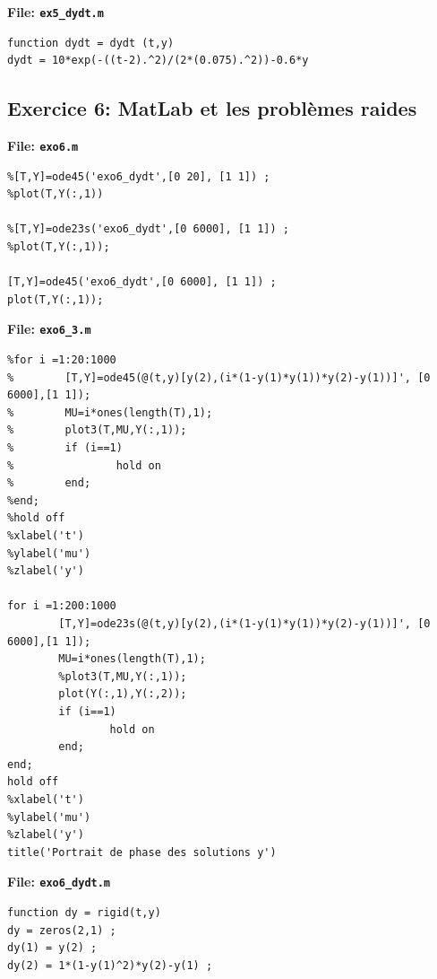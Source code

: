 \documentclass[a4paper,12pt,landscape]{article}
\begin{document}
\textbf{File: \texttt{ex5\_dydt.m}}
\begin{tiny}
\begin{verbatim}
function dydt = dydt (t,y)
dydt = 10*exp(-((t-2).^2)/(2*(0.075).^2))-0.6*y
\end{verbatim}
\end{tiny}
\newpage
\subsection{Exercice 6: MatLab et les problèmes raides}
\textbf{File: \texttt{exo6.m}}
\begin{tiny}
\begin{verbatim}
%[T,Y]=ode45('exo6_dydt',[0 20], [1 1]) ;
%plot(T,Y(:,1))

%[T,Y]=ode23s('exo6_dydt',[0 6000], [1 1]) ;
%plot(T,Y(:,1));

[T,Y]=ode45('exo6_dydt',[0 6000], [1 1]) ;
plot(T,Y(:,1));
\end{verbatim}
\end{tiny}

\textbf{File: \texttt{exo6\_3.m}}
\begin{tiny}
\begin{verbatim}
%for i =1:20:1000
%        [T,Y]=ode45(@(t,y)[y(2),(i*(1-y(1)*y(1))*y(2)-y(1))]', [0 6000],[1 1]);
%        MU=i*ones(length(T),1);
%        plot3(T,MU,Y(:,1));
%        if (i==1)
%                hold on 
%        end;
%end;
%hold off
%xlabel('t')
%ylabel('mu')
%zlabel('y')

for i =1:200:1000
        [T,Y]=ode23s(@(t,y)[y(2),(i*(1-y(1)*y(1))*y(2)-y(1))]', [0 6000],[1 1]);
        MU=i*ones(length(T),1);
        %plot3(T,MU,Y(:,1));
        plot(Y(:,1),Y(:,2));
        if (i==1)
                hold on 
        end;
end;
hold off
%xlabel('t')
%ylabel('mu')
%zlabel('y')
title('Portrait de phase des solutions y')
\end{verbatim}
\end{tiny}

\textbf{File: \texttt{exo6\_dydt.m}}
\begin{tiny}
\begin{verbatim}
function dy = rigid(t,y)
dy = zeros(2,1) ;
dy(1) = y(2) ;
dy(2) = 1*(1-y(1)^2)*y(2)-y(1) ;
\end{verbatim}
\end{tiny}
\end{document}
